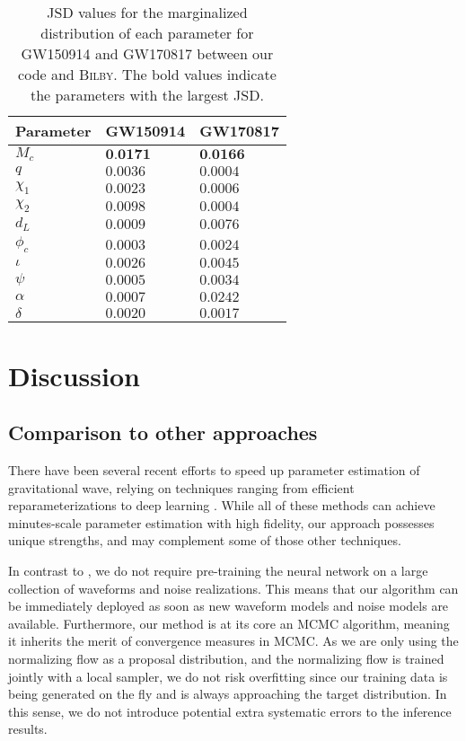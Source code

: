 \documentclass[twocolumn]{aastex631}
\begin{document}
\begin{table}[hbt!]
    \begin{center}
    \begin{tabular}{ l l l}
    \hline
    \hline
    Parameter & GW150914 & GW170817\\
    \hline
        $M_c$ & $\textbf{0.0171}$ & $\textbf{0.0166}$ \\
        $q$ & $0.0036$ & $0.0004$ \\
        $\chi_1$ & $0.0023$ & $0.0006$ \\
        $\chi_2$ & $0.0098$ & $0.0004$ \\
        $d_L$ & $0.0009$ & $0.0076$ \\
        $\phi_c$ & $0.0003$ & $0.0024$ \\
        $\iota$ & $0.0026$ & $0.0045$ \\
        $\psi$ & $0.0005$ & $0.0034$ \\
        $\alpha$ & $0.0007$ & $0.0242$ \\
        $\delta$ & $0.0020$ & $0.0017$ \\
    \hline
    \hline
    \end{tabular}
    \caption{JSD values for the marginalized distribution of each parameter for
    GW150914 and GW170817 between our code and \textsc{Bilby}. The bold values
    indicate the parameters with the largest JSD.}
    \label{tab:JSD}
    \end{center}
\end{table}

\section{Discussion}
\label{sec: Discussion}

\subsection{Comparison to other approaches}

There have been several recent efforts to speed up parameter estimation of
gravitational wave, relying on techniques ranging from efficient
reparameterizations \cite{Islam:2022afg,Roulet:2022kot} to deep learning
\cite{Dax:2021tsq,Dax:2022pxd}. While all of these methods can achieve
minutes-scale parameter estimation with high fidelity, our approach possesses
unique strengths, and may complement some of those other techniques.

In contrast to \cite{Dax:2021tsq,Dax:2022pxd}, we do not require pre-training
the neural network on a large collection of waveforms and noise realizations.
This means that our algorithm can be immediately deployed as soon as new
waveform models and noise models are available. Furthermore, our method is at
its core an MCMC algorithm, meaning it inherits the merit of convergence
measures in MCMC. As we are only using the normalizing flow as a proposal
distribution, and the normalizing flow is trained jointly with a local sampler,
we do not risk overfitting since our training data is being generated on the
fly and is always approaching the target distribution. In this sense, we do not
introduce potential extra systematic errors to the inference results.
\end{document}
